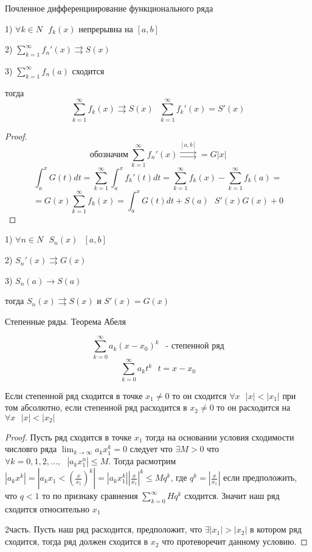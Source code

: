 \begin{title}
  Почленное дифференциирование функционального ряда
\end{title}

\begin{theorem}
  1) $\forall k \in N ~~~ f_k(x)$ непрерывна на $[a,b]$

  2) $\sum_{k=1}^{\infty} f_n'(x) \rightrightarrows S(x)$

  3) $\sum_{k=1}^{\infty} f_n(a)$ сходится

  тогда
  $$
  \sum_{k=1}^{\infty} f_k(x) \rightrightarrows S(x) ~~~
  \sum_{k=1}^{\infty} f_k'(x) = S'(x)
  $$
\end{theorem}

\begin{proof}
  $$
  \text{обозначим} ~ \sum_{k=1}^{\infty} f_n'(x)
  \stackrel{[a,b]}{\rightrightarrows} = G|x|
  $$
  $$
  \int_a^x G(t)dt = \sum_{k=1}^{\infty} \int_a^x f_k'(t) dt =
  \sum_{k=1}^{\infty} f_k(x) - \sum_{k=1}^{\infty} f_k(a) =
  $$
  $$
  = G(x) \sum_{k=1}^{\infty} f_k(x) = \int_a^x G(t)dt + S(a) ~~~ S'(x) G(x) + 0
  $$
\end{proof}

\begin{theorem}
  1) $\forall n \in N ~~~ S_n(x) ~~~ [a,b]$

  2) $S_n'(x) \rightrightarrows G(x)$

  3) $S_n(a) \to S(a)$

  тогда $S_n(x) \rightrightarrows S(x)$ и $S'(x) = G(x)$
\end{theorem}

\begin{title}
  Степенные ряды. Теорема Абеля
\end{title}

\begin{define}
  $$
  \sum_{k=0}^{\infty} a_k (x-x_0)^k ~~ \text{ - степенной ряд}
  $$
  $$
  \sum_{k=0}^{\infty} a_k t^k ~~~ t = x - x_0
  $$
\end{define}

\begin{theorem}[Абеля]
  Если степенной ряд сходится в точке $x_1 \not= 0$ то он сходится
  $\forall x ~~~ |x| < |x_1|$ при том абсолютно, если степенной ряд расходится
  в $x_2 \not= 0$ то он расходится на $\forall x ~~~ |x| < |x_2|$
\end{theorem}

\begin{proof}
  Пусть ряд сходится в точке $x_1$ тогда на основании условия сходимости
  числовго ряда $\lim_{k \to \infty} a_k x_1^k = 0$ следует что $\exists M > 0$
  что $\forall k = 0, 1,2, \ldots,  ~~~ |a_k x_1^n| \le M$. Тогда
  расмотрим $|a_k x^k| = \left| a_k x_1 < \left( \frac{x}{x_1} \right)^k
  \right| = |a_k x_1^k| \left| \frac{x}{x_1} \right|^k \le Mq^k$, где
  $q^k = \left| \frac{x}{x_1} \right|$ если предположить, что $q < 1$ то по
  признаку сравнения $\sum_{k=0}^{\infty} Hq^k$ сходится. Значит наш ряд
  сходится относительно $x_1$

  2часть. Пусть наш ряд расходится, предположит, что $\exists |x_1| > |x_2|$ в
  котором ряд сходится, тогда ряд должен сходится в $x_2$ что протеворечит
  данному условию.
\end{proof}


